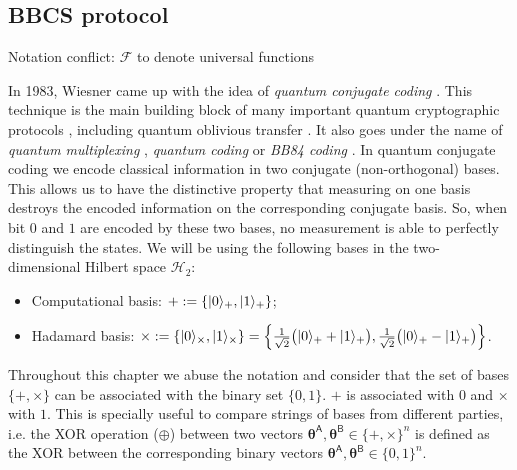 \subsection{BBCS protocol}\label{sec:BBCS}

{\cv Notation conflict: $\mathcal{F}$ to denote universal functions}

In 1983, Wiesner came up with the idea of \textit{quantum conjugate coding} \cite{W83}. This technique is the main building block of many important quantum cryptographic protocols \cite{BB84, BBBW83, DFSS14}, including quantum oblivious transfer \cite{BBCS92}. It also goes under the name of \textit{quantum multiplexing} \cite{BBBW83}, \textit{quantum coding} \cite{BBB14} or \textit{BB84 coding} \cite{S99}. In quantum conjugate coding we encode classical information in two conjugate (non-orthogonal) bases. This allows us to have the distinctive property that measuring on one basis destroys the encoded information on the corresponding conjugate basis. So, when bit $0$ and $1$ are encoded by these two bases, no measurement is able to perfectly distinguish the states. We will be using the following bases in the two-dimensional Hilbert space $\mathcal{H}_2$:

\begin{itemize}
    \item Computational basis: $+ := \left\{| 0 \rangle_{+}, | 1 \rangle_{+}\right\}$;
    \item Hadamard basis: $\times := \left\{| 0 \rangle_{\times}, | 1 \rangle_{\times}\right\} = \left\{\frac{1}{\sqrt{2}}\big( | 0 \rangle_{+} + | 1 \rangle_{+} \big), \frac{1}{\sqrt{2}}\big( | 0 \rangle_{+} - | 1 \rangle_{+} \big) \right\}$.
\end{itemize}

Throughout this chapter we abuse the notation and consider that the set of bases $\{+,\times\}$ can be associated with the binary set $\{0,1\}$. $+$ is associated with $0$ and $\times$ with $1$. This is specially useful to compare strings of bases from different parties, i.e. the XOR operation ($\oplus$) between two vectors $\bm{\theta}^{\mathsf{A}}, \bm{\theta}^{\mathsf{B}} \in\{+,\times\}^n$ is defined as the XOR between the corresponding binary vectors $\bm{\theta}^{\mathsf{A}}, \bm{\theta}^{\mathsf{B}} \in\{0,1\}^n$.

\

